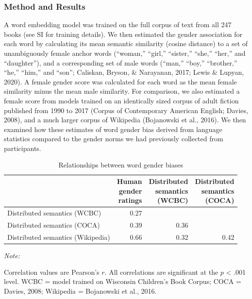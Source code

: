 \documentclass[
  english,
  ,man,floatsintext]{apa6}
\begin{document}
\hypertarget{method-and-results-1}{%
\subsubsection{Method and Results}\label{method-and-results-1}}

A word embedding model was trained on the full corpus of text from all 247 books (see SI for training details). We then estimated the gender association for each word by calculating its mean semantic similarity (cosine distance) to a set of unambiguously female anchor words (\enquote{woman,} \enquote{girl,} \enquote{sister,} \enquote{she,} \enquote{her,} and \enquote{daughter}), and a corresponding set of male words (``man,'' ``boy,'' ``brother,'' ``he,'' ``him,'' and ``son''; Caliskan, Bryson, \& Narayanan, 2017; Lewis \& Lupyan, 2020). A female gender score was calculated for each word as the mean female similarity minus the mean male similarity. For comparison, we also estimated a female score from models trained on an identically sized corpus of adult fiction published from 1990 to 2017 (Corpus of Contemporary American English; Davies, 2008), and a much larger corpus of Wikipedia (Bojanowski et al., 2016). We then examined how these estimates of word gender bias derived from language statistics compared to the gender norms we had previously collected from participants.

\begin{table}

\caption{\label{tab:wordgendertable}Relationships between word gender biases}
\centering
\fontsize{7}{9}\selectfont
\begin{threeparttable}
\begin{tabular}[t]{lrrr}
\toprule
 & \makecell[c]{Human\\gender\\ratings} & \makecell[r]{Distributed\\semantics\\(WCBC)} & \makecell[l]{Distributed\\semantics\\(COCA)}\\
\midrule
Distributed semantics (WCBC) & 0.27 &  & \\
Distributed semantics (COCA) & 0.39 & 0.36 & \\
Distributed semantics (Wikipedia) & 0.66 & 0.32 & 0.42\\
\bottomrule
\end{tabular}
\begin{tablenotes}[para]
\item \textit{Note:} 
\item Correlation values are Pearson's $r$. All correlations are significant at the $p$ < .001 level. WCBC = model trained on Wisconsin Children’s Book Corpus; COCA = Davies, 2008; Wikipedia = Bojanowski et al., 2016.
\end{tablenotes}
\end{threeparttable}
\end{table}
\end{document}
